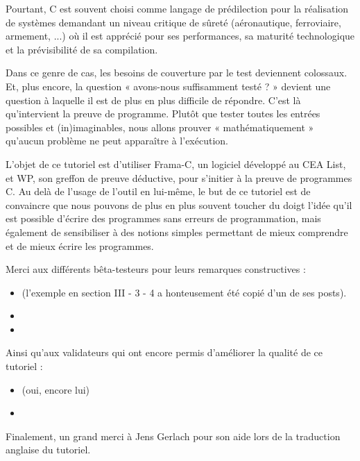 \documentclass[middle]{zmdocument}
\begin{document}
Pourtant, C est souvent choisi comme langage de prédilection pour la 
réalisation de systèmes demandant un niveau critique de sûreté (aéronautique, 
ferroviaire, armement, ...) où il est apprécié pour ses performances, sa 
maturité technologique et la prévisibilité de sa compilation.



Dans ce genre de cas, les besoins de couverture par le test deviennent 
colossaux. Et, plus encore, la question « avons-nous suffisamment testé ? » 
devient une question à laquelle il est de plus en plus difficile de répondre.
C'est là qu'intervient la preuve de programme. Plutôt que tester toutes les 
entrées possibles et (in)imaginables, nous allons prouver « mathématiquement »
qu'aucun problème ne peut apparaître à l'exécution.



L'objet de ce tutoriel est d'utiliser Frama-C, un logiciel développé au 
CEA List, et WP, son greffon de preuve déductive, pour s'initier à la preuve 
de programmes C. Au delà de l'usage de l'outil en lui-même, le but de ce tutoriel
est de convaincre que nous pouvons de plus en plus souvent toucher du 
doigt l'idée qu'il est possible d'écrire des programmes sans erreurs de 
programmation, mais également de sensibiliser à des notions simples 
permettant de mieux comprendre et de mieux écrire les programmes.



\begin{Information}
Merci aux différents bêta-testeurs pour leurs remarques constructives :

\begin{itemize}
\item {} (l'exemple en section 
III - 3 - 4 a honteusement été copié d'un de ses posts).
\item {}
\item {}
\end{itemize}
Ainsi qu'aux validateurs qui ont encore permis d'améliorer la qualité de ce tutoriel :

\begin{itemize}
\item {} (oui, encore lui)
\item {}
\end{itemize}
Finalement, un grand merci à Jens Gerlach pour son aide lors de la traduction
anglaise du tutoriel.
\end{Information}
\end{document}
